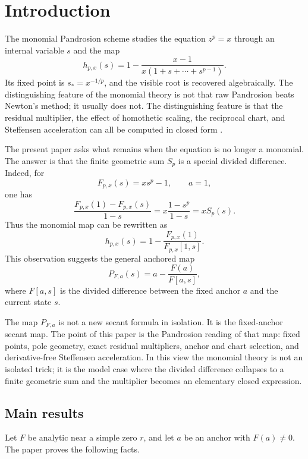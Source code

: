 \documentclass[11pt]{article}
\theoremstyle{definition}
\begin{document}
\tableofcontents

\section{Introduction}

The monomial Pandrosion scheme studies the equation $z^p=x$ through an internal variable $s$ and the map
\[
        h_{p,x}(s)=1-\frac{x-1}{x(1+s+\cdots+s^{p-1})}.
\]
Its fixed point is $s_*=x^{-1/p}$, and the visible root is recovered algebraically.  The distinguishing feature of the monomial theory is not that raw Pandrosion beats Newton's method; it usually does not.  The distinguishing feature is that the residual multiplier, the effect of homothetic scaling, the reciprocal chart, and Steffensen acceleration can all be computed in closed form \cite{BesevicMonomial2026}.

The present paper asks what remains when the equation is no longer a monomial.  The answer is that the finite geometric sum $S_p$ is a special divided difference.  Indeed, for
\[
        F_{p,x}(s)=xs^p-1,
        \qquad a=1,
\]
one has
\[
        \frac{F_{p,x}(1)-F_{p,x}(s)}{1-s}
        =x\frac{1-s^p}{1-s}=xS_p(s).
\]
Thus the monomial map can be rewritten as
\[
        h_{p,x}(s)=1-\frac{F_{p,x}(1)}{F_{p,x}[1,s]}.
\]
This observation suggests the general anchored map
\[
        P_{F,a}(s)=a-\frac{F(a)}{F[a,s]},
\]
where $F[a,s]$ is the divided difference between the fixed anchor $a$ and the current state $s$.

The map $P_{F,a}$ is not a new secant formula in isolation.  It is the fixed-anchor secant map.  The point of this paper is the Pandrosion reading of that map: fixed points, pole geometry, exact residual multipliers, anchor and chart selection, and derivative-free Steffensen acceleration.  In this view the monomial theory is not an isolated trick; it is the model case where the divided difference collapses to a finite geometric sum and the multiplier becomes an elementary closed expression.

\subsection*{Main results}

Let $F$ be analytic near a simple zero $r$, and let $a$ be an anchor with $F(a)\ne0$.  The paper proves the following facts.
\end{document}
